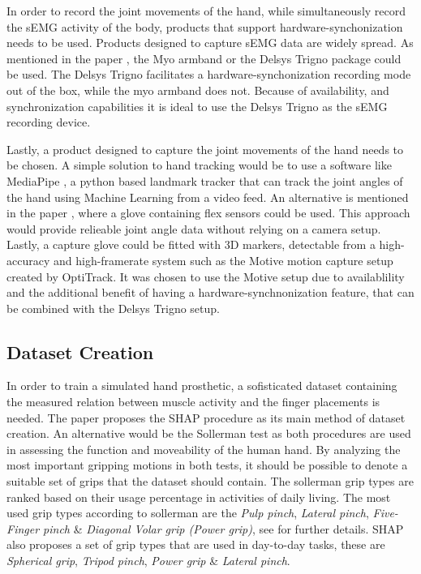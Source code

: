\documentclass[../main.tex]{subfiles}
\begin{document}
In order to record the joint movements of the hand, while simultaneously record the sEMG activity of the body, products that support hardware-synchonization needs to be used.
Products designed to capture sEMG data are widely spread.
As mentioned in the paper \cite{Zhaolong2021}, the Myo armband \cite{myo} or the Delsys Trigno package \cite{emgworks} could be used.
The Delsys Trigno \cite{emgworks} facilitates a hardware-synchonization recording mode out of the box, while the myo armband \cite{myo} does not.
Because of availability, and synchronization capabilities it is ideal to use the Delsys Trigno as the sEMG recording device.

Lastly, a product designed to capture the joint movements of the hand needs to be chosen.
A simple solution to hand tracking would be to use a software like MediaPipe \cite{mediapipe}, a python based landmark tracker that can track the joint angles of the hand using Machine Learning from a video feed.
An alternative is mentioned in the paper \cite{Zhaolong2021}, where a glove containing flex sensors could be used.
This approach would provide relieable joint angle data without relying on a camera setup.
Lastly, a capture glove could be fitted with 3D markers, detectable from a high-accuracy and high-framerate system such as the Motive motion capture setup \cite{optitrack} created by OptiTrack.
It was chosen to use the Motive setup due to availablility and the additional benefit of having a hardware-synchnonization feature, that can be combined with the Delsys Trigno \cite{emgworks} setup.


\subsection{Dataset Creation}
\label{sec:dataset}

In order to train a simulated hand prosthetic, a sofisticated dataset containing the measured relation between muscle activity and the finger placements is needed.
The paper \cite{KeunTaeKim2021} proposes the SHAP procedure \cite{shap} as its main method of dataset creation.
An alternative would be the Sollerman test \cite{sollerman} as both procedures are used in assessing the function and moveability of the human hand.
By analyzing the most important gripping motions in both tests, it should be possible to denote a suitable set of grips that the dataset should contain.
The sollerman grip types are ranked based on their usage percentage in activities of daily living.
The most used grip types according to sollerman are the \textit{Pulp pinch}, \textit{Lateral pinch}, \textit{Five-Finger pinch} \& \textit{Diagonal Volar grip (Power grip)}, see \cite{sollerman} for further details.
SHAP also proposes a set of grip types that are used in day-to-day tasks, these are \textit{Spherical grip}, \textit{Tripod pinch}, \textit{Power grip} \& \textit{Lateral pinch}.
\end{document}
